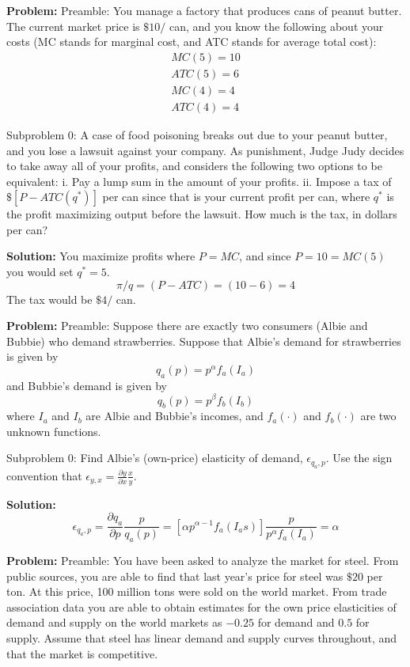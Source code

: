 \documentclass[10pt]{article}
\begin{document}
\textbf{Problem:}
Preamble: You manage a factory that produces cans of peanut butter. The current market price is $\$ 10 /$ can, and you know the following about your costs (MC stands for marginal cost, and ATC stands for average total cost):
\[
\begin{array}{l}
MC(5)=10 \\
ATC(5)=6 \\
MC(4)=4 \\
ATC(4)=4
\end{array}
\]

Subproblem 0: A case of food poisoning breaks out due to your peanut butter, and you lose a lawsuit against your company. As punishment, Judge Judy decides to take away all of your profits, and considers the following two options to be equivalent:
i. Pay a lump sum in the amount of your profits.
ii. Impose a tax of $\$\left[P-A T C\left(q^{*}\right)\right]$ per can since that is your current profit per can, where $q^{*}$ is the profit maximizing output before the lawsuit.
How much is the tax, in dollars per can?


\textbf{Solution:}
You maximize profits where $P=M C$, and since $P=10=M C(5)$ you would set $q^{*}=5$.
\[
\pi / q=(P-A T C)=(10-6)=4
\]
The tax would be $\$ \boxed{4} /$ can.


\textbf{Problem:}
Preamble: Suppose there are exactly two consumers (Albie and Bubbie) who demand strawberries. Suppose that Albie's demand for strawberries is given by
\[
q_{a}(p)=p^{\alpha} f_{a}\left(I_{a}\right)
\]
and Bubbie's demand is given by
\[
q_{b}(p)=p^{\beta} f_{b}\left(I_{b}\right)
\]
where $I_{a}$ and $I_{b}$ are Albie and Bubbie's incomes, and $f_{a}(\cdot)$ and $f_{b}(\cdot)$ are two unknown functions.

Subproblem 0: Find Albie's (own-price) elasticity of demand, $\epsilon_{q_{a}, p}$. Use the sign convention that $\epsilon_{y, x}=\frac{\partial y}{\partial x} \frac{x}{y}$.


\textbf{Solution:}
\[
\epsilon_{q_{a}, p}=\frac{\partial q_{a}}{\partial p} \frac{p}{q_{a}(p)}=\left[\alpha p^{\alpha-1} f_{a}\left(I_{a} s\right)\right] \frac{p}{p^{\alpha} f_{a}\left(I_{a}\right)}=\boxed{\alpha}
\]


\textbf{Problem:}
Preamble: You have been asked to analyze the market for steel. From public sources, you are able to find that last year's price for steel was $\$ 20$ per ton. At this price, 100 million tons were sold on the world market. From trade association data you are able to obtain estimates for the own price elasticities of demand and supply on the world markets as $-0.25$ for demand and $0.5$ for supply. Assume that steel has linear demand and supply curves throughout, and that the market is competitive.
\end{document}
